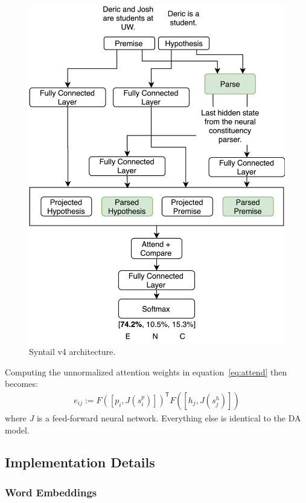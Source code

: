 \documentclass[11pt,a4paper]{article}
\begin{document}
\begin{figure}[htb]
    \centering
    \includegraphics[width=\linewidth]{figures/v4.png}
    \caption{Syntail v4 architecture.}
\label{fig:v4}
\end{figure}

Computing the unnormalized attention weights in equation~\ref{eq:attend} then
becomes:
\begin{align}
    e_{ij} := F([p_i, J(s^p_i)])^\mathsf{T} F([h_j, J(s^h_j)])
\end{align}
where $J$ is a feed-forward neural network. Everything else is identical to
the DA model.

\subsection{Implementation Details}

\subsubsection{Word Embeddings}
\end{document}
